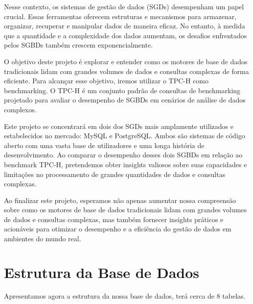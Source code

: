 \documentclass{article}
\begin{document}
\texttt{}\par Nesse contexto, os sistemas de gestão de dados (SGDs) desempenham um papel crucial. Essas ferramentas oferecem estruturas e mecanismos para armazenar, organizar, recuperar e manipular dados de maneira eficaz. No entanto, à medida que a quantidade e a complexidade dos dados aumentam, os desafios enfrentados pelos SGBDs também crescem exponencialmente.\\

\texttt{}\par O objetivo deste projeto é explorar e entender como os motores de base de dados tradicionais lidam com grandes volumes de dados e consultas complexas de forma eficiente. Para alcançar esse objetivo, iremos utilizar o TPC-H como benchmarking. O TPC-H é um conjunto padrão de consultas de benchmarking projetado para avaliar o desempenho de SGBDs em cenários de análise de dados complexos.\\

\texttt{}\par Este projeto se concentrará em dois dos SGDs mais amplamente utilizados e estabelecidos no mercado: MySQL e PostgreSQL. Ambos são sistemas de código aberto com uma vasta base de utilizadores e uma longa história de desenvolvimento. Ao comparar o desempenho desses dois SGBDs em relação ao benchmark TPC-H, pretendemos obter insights valiosos sobre suas capacidades e limitações no processamento de grandes quantidades de dados e consultas complexas.\\

\texttt{}\par Ao finalizar este projeto, esperamos não apenas aumentar nossa compreensão sobre como os motores de base de dados tradicionais lidam com grandes volumes de dados e consultas complexas, mas também fornecer insights práticos e acionáveis para otimizar o desempenho e a eficiência do gestão de dados em ambientes do mundo real.\\
\clearpage

\section{Estrutura da Base de Dados}
Apresentamos agora a estrutura da nossa base de dados, terá cerca de 8 tabelas.\\
\end{document}
